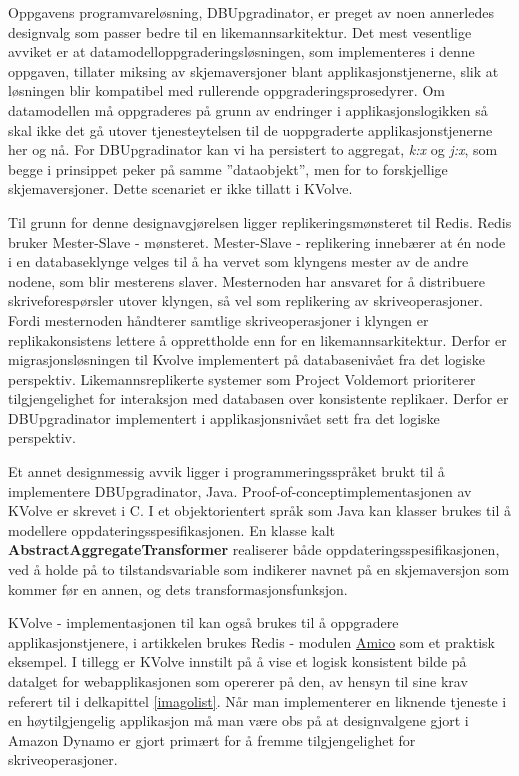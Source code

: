 Oppgavens programvareløsning, DBUpgradinator, er preget av noen annerledes designvalg som passer bedre til en likemannsarkitektur. Det mest vesentlige avviket er at datamodelloppgraderingsløsningen, som implementeres i denne oppgaven, tillater miksing av skjemaversjoner blant applikasjonstjenerne, slik at løsningen blir kompatibel med rullerende oppgraderingsprosedyrer. Om datamodellen må oppgraderes på grunn av endringer i applikasjonslogikken så skal ikke det gå utover tjenesteytelsen til de uoppgraderte applikasjonstjenerne her og nå. For DBUpgradinator kan vi ha persistert to aggregat, \emph{k:x} og \emph{j:x}, som begge i prinsippet peker på samme ''dataobjekt'', men for to forskjellige skjemaversjoner. Dette scenariet er ikke tillatt i KVolve.

Til grunn for denne designavgjørelsen ligger replikeringsmønsteret til Redis. Redis bruker Mester-Slave - mønsteret. Mester-Slave - replikering innebærer at én node i en databaseklynge velges til å ha vervet som klyngens mester av de andre nodene, som blir mesterens slaver. Mesternoden har ansvaret for å distribuere skriveforespørsler utover klyngen, så vel som replikering av skriveoperasjoner. Fordi mesternoden håndterer samtlige skriveoperasjoner i klyngen er replikakonsistens lettere å opprettholde enn for en likemannsarkitektur. Derfor er migrasjonsløsningen til Kvolve implementert på databasenivået fra det logiske perspektiv. Likemannsreplikerte systemer som Project Voldemort prioriterer tilgjengelighet for interaksjon med databasen over konsistente replikaer. Derfor er DBUpgradinator implementert i applikasjonsnivået sett fra det logiske perspektiv.

Et annet designmessig avvik ligger i programmeringsspråket brukt til å implementere DBUpgradinator, Java. Proof-of-concept\-implementasjonen av KVolve er skrevet i C. I et objektorientert språk som Java kan klasser brukes til å modellere oppdateringsspesifikasjonen. En klasse kalt \textbf{AbstractAggregateTransformer} realiserer både oppdateringsspesifikasjonen, ved å holde på to tilstandsvariable som indikerer navnet på en skjemaversjon som kommer før en annen, og dets transformasjonsfunksjon.

KVolve - implementasjonen til \cite{saur2016} kan også brukes til å oppgradere applikasjonstjenere, i artikkelen brukes Redis - modulen \underline{Amico} som et praktisk eksempel. I tillegg er KVolve innstilt på å vise et logisk konsistent bilde på datalget for webapplikasjonen som opererer på den, av hensyn til \cite{dumitras2009nodowntime} sine krav referert til i delkapittel \ref{imagolist}. Når man implementerer en liknende tjeneste i en høytilgjengelig applikasjon må man være obs på at designvalgene gjort i Amazon Dynamo er gjort primært for å fremme tilgjengelighet for skriveoperasjoner.

